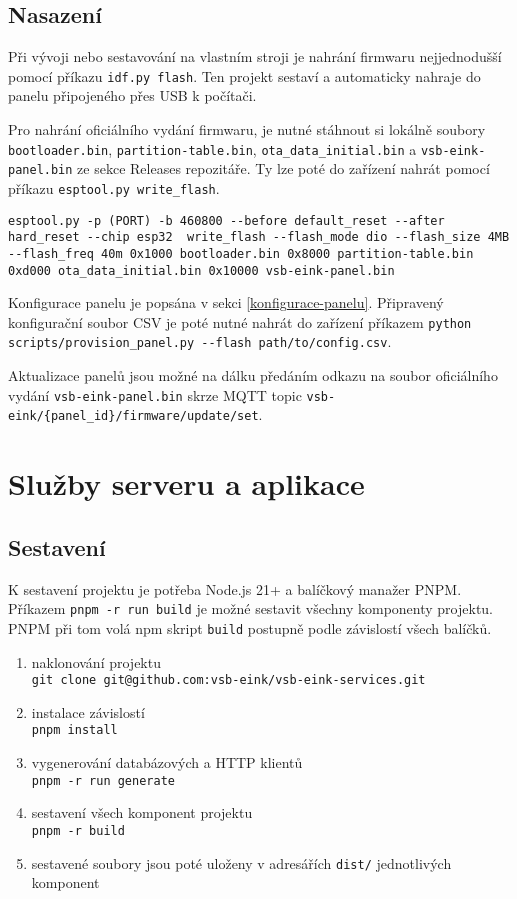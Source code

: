 \subsection{Nasazení}
Při vývoji nebo sestavování na vlastním stroji je nahrání firmwaru nejjednodušší pomocí příkazu \lstinline|idf.py flash|. Ten projekt sestaví a automaticky nahraje do panelu připojeného přes USB k počítači.

Pro nahrání oficiálního vydání firmwaru, je nutné stáhnout si lokálně soubory \lstinline|bootloader.bin|, \lstinline|partition-table.bin|, \lstinline|ota_data_initial.bin| a \lstinline|vsb-eink-panel.bin| ze sekce Releases repozitáře. Ty lze poté do zařízení nahrát pomocí příkazu \lstinline|esptool.py write_flash|.

\begin{lstlisting}[label=src:panel-firmware-flash, caption={Nahrání oficiálního firmwaru do panelu}]
esptool.py -p (PORT) -b 460800 --before default_reset --after hard_reset --chip esp32  write_flash --flash_mode dio --flash_size 4MB --flash_freq 40m 0x1000 bootloader.bin 0x8000 partition-table.bin 0xd000 ota_data_initial.bin 0x10000 vsb-eink-panel.bin
\end{lstlisting}

Konfigurace panelu je popsána v sekci \ref{konfigurace-panelu}. Připravený konfigurační soubor CSV je poté nutné nahrát do zařízení příkazem \lstinline|python scripts/provision_panel.py --flash path/to/config.csv|.

Aktualizace panelů jsou možné na dálku předáním odkazu na soubor oficiálního vydání \lstinline|vsb-eink-panel.bin| skrze MQTT topic \lstinline|vsb-eink/{panel_id}/firmware/update/set|.

\section{Služby serveru a aplikace}
\subsection{Sestavení}
K sestavení projektu je potřeba Node.js 21+ a balíčkový manažer PNPM. Příkazem \lstinline|pnpm -r run build| je možné sestavit všechny komponenty projektu. PNPM při tom volá npm skript \lstinline|build| postupně podle závislostí všech balíčků.

\begin{enumerate}
    \item naklonování projektu \\ \lstinline{git clone git@github.com:vsb-eink/vsb-eink-services.git}
    \item instalace závislostí \\ \lstinline{pnpm install}
    \item vygenerování databázových a HTTP klientů \\ \lstinline{pnpm -r run generate}
    \item sestavení všech komponent projektu \\ \lstinline{pnpm -r build}
    \item sestavené soubory jsou poté uloženy v adresářích \lstinline|dist/| jednotlivých komponent 
\end{enumerate}

